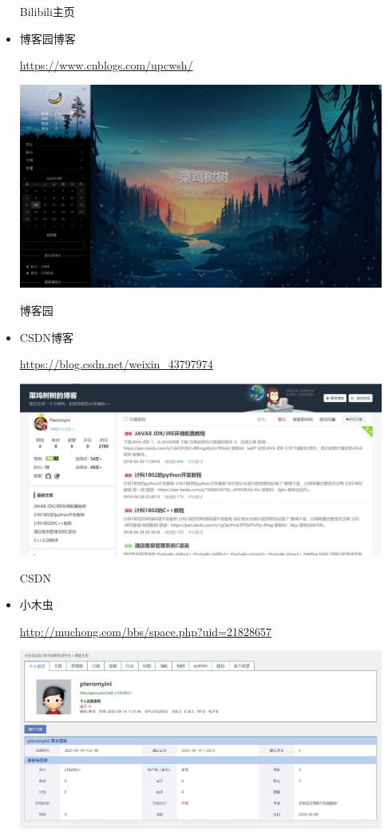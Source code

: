 \documentclass{article}
\begin{document}
\begin{itemize}
	\centerline{Bilibili主页}
	\par
	\item 博客园博客
	\par
	\url{https://www.cnblogs.com/upcwsh/}
	\par
	\centerline{\includegraphics[width=12cm]{cnblogs}}
	\centerline{博客园}	
	\par
	\item CSDN博客
	\par
	\url{https://blog.csdn.net/weixin_43797974}
	\par
	\centerline{\includegraphics[width=12cm]{csdn}}
	\centerline{CSDN}	
	\par 
	\item 小木虫
	\par
	\url{http://muchong.com/bbs/space.php?uid=21828657}
	\par
	\centerline{\includegraphics[width=12cm]{xiaomuchong}}

\end{itemize}
\end{document}
